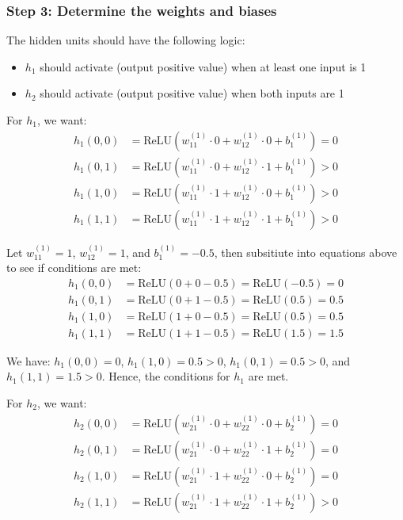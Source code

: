 \documentclass{article}
\begin{document}
\subsubsection*{Step 3: Determine the weights and biases}
\parbox{\textwidth}{
The hidden units should have the following logic:
\begin{itemize}
    \item $h_1$ should activate (output positive value) when at least one input is 1
    \item $h_2$ should activate (output positive value) when both inputs are 1
\end{itemize}

For $h_1$, we want:
\begin{align*}
h_1(0,0) &= \text{ReLU}(w_{11}^{(1)} \cdot 0 + w_{12}^{(1)} \cdot 0 + b_1^{(1)}) = 0\\
h_1(0,1) &= \text{ReLU}(w_{11}^{(1)} \cdot 0 + w_{12}^{(1)} \cdot 1 + b_1^{(1)}) > 0\\
h_1(1,0) &= \text{ReLU}(w_{11}^{(1)} \cdot 1 + w_{12}^{(1)} \cdot 0 + b_1^{(1)}) > 0\\
h_1(1,1) &= \text{ReLU}(w_{11}^{(1)} \cdot 1 + w_{12}^{(1)} \cdot 1 + b_1^{(1)}) > 0
\end{align*}

Let $w_{11}^{(1)} = 1$, $w_{12}^{(1)} = 1$, and $b_1^{(1)} = -0.5$, then subsitiute into equations above to see if conditions are met:
\begin{align*}
h_1(0,0) &= \text{ReLU}(0 + 0 - 0.5) = \text{ReLU}(-0.5) = 0\\
h_1(0,1) &= \text{ReLU}(0 + 1 - 0.5) = \text{ReLU}(0.5) = 0.5\\
h_1(1,0) &= \text{ReLU}(1 + 0 - 0.5) = \text{ReLU}(0.5) = 0.5\\
h_1(1,1) &= \text{ReLU}(1 + 1 - 0.5) = \text{ReLU}(1.5) = 1.5
\end{align*}

We have: $h_1(0,0) = 0$, $h_1(1,0) = 0.5 > 0$, $h_1(0,1) = 0.5 > 0$, and $h_1(1,1) = 1.5 > 0$.
Hence, the conditions for $h_1$ are met.

For $h_2$, we want:
\begin{align*}
h_2(0,0) &= \text{ReLU}(w_{21}^{(1)} \cdot 0 + w_{22}^{(1)} \cdot 0 + b_2^{(1)}) = 0\\
h_2(0,1) &= \text{ReLU}(w_{21}^{(1)} \cdot 0 + w_{22}^{(1)} \cdot 1 + b_2^{(1)}) = 0\\
h_2(1,0) &= \text{ReLU}(w_{21}^{(1)} \cdot 1 + w_{22}^{(1)} \cdot 0 + b_2^{(1)}) = 0\\
h_2(1,1) &= \text{ReLU}(w_{21}^{(1)} \cdot 1 + w_{22}^{(1)} \cdot 1 + b_2^{(1)}) > 0
\end{align*}

}
\end{document}
